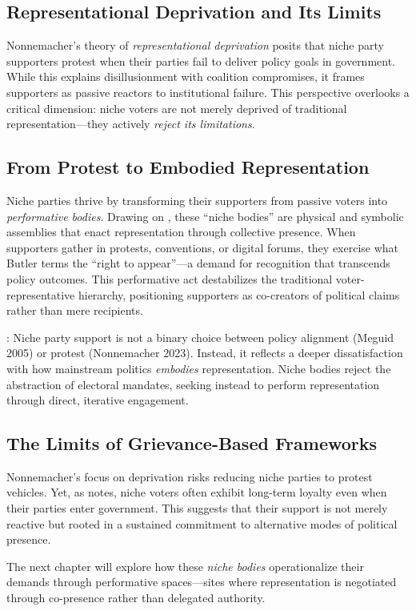 \begin{greenenv}
	\subsection{Representational Deprivation and Its Limits}
	Nonnemacher’s \parencite*{nonnemacher2023} theory of \textit{representational deprivation} posits that niche party supporters protest when their parties fail to deliver policy goals in government. While this explains disillusionment with coalition compromises, it frames supporters as passive reactors to institutional failure. This perspective overlooks a critical dimension: niche voters are not merely deprived of traditional representation—they actively \textit{reject its limitations}.

	\subsection{From Protest to Embodied Representation}
	Niche parties thrive by transforming their supporters from passive voters into \textit{performative bodies}. Drawing on \cite{kim2024}, these “niche bodies” are physical and symbolic assemblies that enact representation through collective presence. When supporters gather in protests, conventions, or digital forums, they exercise what Butler terms the \enquote{right to appear}—a demand for recognition that transcends policy outcomes. This performative act destabilizes the traditional voter-representative hierarchy, positioning supporters as co-creators of political claims rather than mere recipients.

	: Niche party support is not a binary choice between policy alignment (Meguid 2005) or protest (Nonnemacher 2023). Instead, it reflects a deeper dissatisfaction with how mainstream politics \textit{embodies} representation. Niche bodies reject the abstraction of electoral mandates, seeking instead to perform representation through direct, iterative engagement.

	\subsection{The Limits of Grievance-Based Frameworks}
	Nonnemacher’s \parencite*{nonnemacher2023} focus on deprivation risks reducing niche parties to protest vehicles. Yet, as \cite{stiers2024} notes, niche voters often exhibit long-term loyalty even when their parties enter government. This suggests that their support is not merely reactive but rooted in a sustained commitment to alternative modes of political presence.

	The next chapter will explore how these \textit{niche bodies} operationalize their demands through performative spaces—sites where representation is negotiated through co-presence rather than delegated authority.
\end{greenenv}



